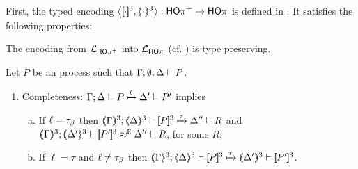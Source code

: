 \documentclass[runningheads]{llncs}
\begin{document}
{{%
First, the typed encoding
$\enco{\map{\cdot}^{3}, \mapt{\cdot}^{3}}: \HOpp \to \HOp$ is defined
in .
It satisfies the following properties:
{
\begin{proposition}
The encoding from $\mathcal{L}_{\mathsf{HO\pi^{+}}}$ into $\mathcal{L}_{\mathsf{HO}\pi}$ (cf. )
is type preserving.
\end{proposition}}


\begin{proposition} %
	\label{prop:op_corr_HOpp_to_HOp}
	Let $P$ be an \HOpp process such that $\Gamma; \emptyset; \Delta \vdash P$.
	\begin{enumerate}[1.]
		\item	Completeness: 
			$\Gamma; \Delta \vdash P \xmapsto{\ell} \Delta' \vdash P'$ implies
			\begin{enumerate}[a)]
%
				\item	If $\ell = \tau_{\beta}$ then
					$\horel{\tmap{\Gamma}{3}}{\tmap{\Delta}{3}}{\pmap{P}{3}}{\hby{\tau}}
					{\Delta''}{R}$ and
					$\horel{\tmap{\Gamma}{3}}{\tmap{\Delta'}{3}}{\pmap{P'}{3}}{\hwb}{\Delta''}{R}$, for some $R$;

				\item	If $\ell = \tau$ and $\ell \not= \tau_{\beta}$ then %
					$\horel{\tmap{\Gamma}{3}}{\tmap{\Delta}{3}}{\pmap{P}{3}}{\hby{\tau}}
					{\tmap{\Delta'}{3}}{\pmap{P'}{3}}$.
			\end{enumerate}


\end{enumerate}
\end{proposition}}}
\end{document}

